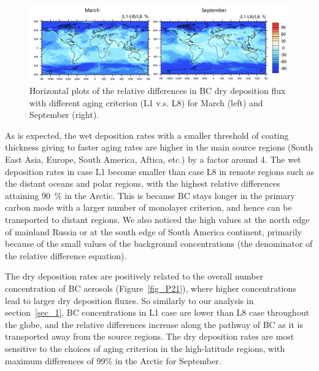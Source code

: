 \documentclass[12pt, fullpage]{uiucthesis2009}
\begin{document}
	
	\begin{figure}[h] 
		\begin{center}
			\includegraphics[width = 1\textwidth]{Figure18}
			\caption[Horizontal plots of the relative differences in BC dry deposition flux with different aging criterion (L1 v.s. L8) for March (left) and September (right)]{\label{fig_P18} Horizontal plots of the relative differences in BC dry deposition flux with different aging criterion (L1 v.s. L8) for March (left) and September (right).}
		\end{center}
	\end{figure}
	
	As is expected, the wet deposition rates with a smaller threshold of coating thickness giving to faster aging rates are higher in the main source regions (South East Asia, Europe, South America, Aftica, etc.) by a factor around 4. The wet deposition rates in case L1 become smaller than case L8 in remote regions such as the distant oceans and polar regions, with the highest relative differences attaining 90~$\%$ in the Arctic. This is because BC stays longer in the primary carbon mode with a larger number of monolayer criterion, and hence can be transported to distant regions. We also noticed the high values at the north edge of mainland Russia or at the south edge of South America continent, primarily because of the small values of the background concentrations (the denominator of the relative difference equation).
	
	The dry deposition rates are positively related to the overall number concentration of BC aerosols (Figure~\ref{fig_P21}), where higher concentrations lead to larger dry deposition fluxes. So similarly to our analysis in section~\ref{sec_1}, BC concentrations in L1 case are lower than L8 case throughout the globe, and the relative differences increase along the pathway of BC as it is transported away from the source regions. The dry deposition rates are most sensitive to the choices of aging criterion in the high-latitude regions, with maximum differences of 99$\%$ in the Arctic for September.  
	
	
\end{document}
